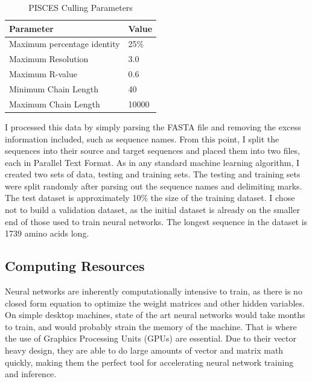 \documentclass[pageno]{jpaper}
\begin{document}
\begin{table}[H]
	\centering
	\caption{PISCES Culling Parameters}
	\label{tb:cull}
	\begin{tabular}{|l|l|}
		\hline
		\textbf{Parameter}          & \textbf{Value} \\ \hline
		Maximum percentage identity & 25\%           \\ \hline
		Maximum Resolution          & 3.0            \\ \hline
		Maximum R-value             & 0.6            \\ \hline
		Minimum Chain Length        & 40             \\ \hline
		Maximum Chain Length        & 10000          \\ \hline
	\end{tabular}
\end{table}

\par
I processed this data by simply parsing the FASTA file and removing the excess information included, such as sequence names.  From this point, I split the sequences into their source and target sequences and placed them into two files, each in Parallel Text Format.  As in any standard machine learning algorithm, I created two sets of data, testing and training sets.  The testing and training sets were split randomly after parsing out the sequence names and delimiting marks.  The test dataset is approximately 10\% the size of the training dataset.  I chose not to build a validation dataset, as the initial dataset is already on the smaller end of those used to train neural networks.  The longest sequence in the dataset is 1739 amino acids long.

\subsection{Computing Resources}
Neural networks are inherently computationally intensive to train, as there is no closed form equation to optimize the weight matrices and other hidden variables.  On simple desktop machines, state of the art neural networks would take months to train, and would probably strain the memory of the machine.  That is where the use of Graphics Processing Units (GPUs) are essential.  Due to their vector heavy design, they are able to do large amounts of vector and matrix math quickly, making them the perfect tool for accelerating neural network training and inference.
\end{document}
